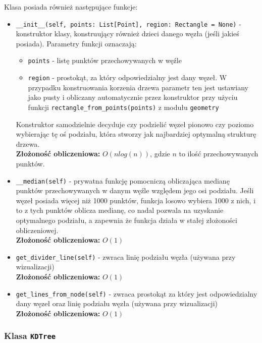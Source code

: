 \documentclass{article}
\begin{document}
Klasa posiada również następujące funkcje:
\begin{itemize}
    \item \texttt{\_\_init\_\_(self, points: List[Point], region: Rectangle = None)} - konstruktor klasy, konstruujący również dzieci danego węzła (jeśli jakieś posiada). Parametry funkcji oznaczają:
    
    \begin{itemize}
        \item \texttt{points} - listę punktów przechowywanych w węźle
        \item \texttt{region} - prostokąt, za który odpowiedzialny jest dany węzeł. W przypadku konstruowania korzenia drzewa parametr ten jest ustawiany jako pusty i obliczany automatycznie przez konstruktor przy użyciu funkcji \texttt{rectangle\_from\_points(points)} z modułu \texttt{geometry}
    \end{itemize}
    Konstruktor samodzielnie decyduje czy podzielić węzeł pionowo czy poziomo wybierając tę oś podziału, która stworzy jak najbardziej optymalną strukturę drzewa.\\
    \textbf{Złożoność obliczeniowa: } $O(nlog(n))$, gdzie $n$ to ilość przechowywanych punktów.
    
    \item \texttt{\_\_median(self)} - prywatna funkcję pomocniczą obliczająca medianę punktów przechowywanych w danym węźle względem jego osi podziału. Jeśli węzeł posiada więcej niż 1000 punktów, funkcja losowo wybiera 1000 z nich, i to z tych punktów oblicza medianę, co nadal pozwala na uzyskanie optymalnego podziału, a zapewnia że funkcja działa w stałej złożoności obliczeniowej.\\
    \textbf{Złożoność obliczeniowa:} $O(1)$
    
    \item \texttt{get\_divider\_line(self)} - zwraca linię podziału węzła (używana przy wizualizacji)\\
    \textbf{Złożoność obliczeniowa:} $O(1)$
    
    \item \texttt{get\_lines\_from\_node(self)} - zwraca prostokąt za który jest odpowiedzialny dany węzeł oraz linię podziału węzła (używana przy wizualizacji) \\
    \textbf{Złożoność obliczeniowa:} $O(1)$
\end{itemize}

\subsubsection{Klasa \texttt{KDTree}}
\end{document}
